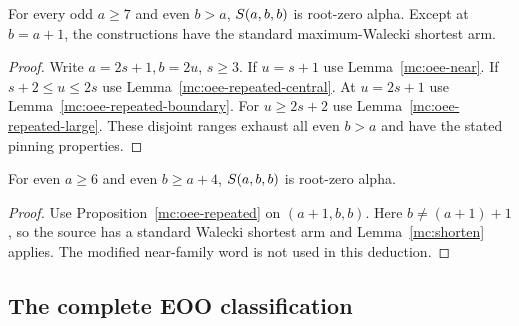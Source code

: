 \begin{proposition}\label{mc:oee-repeated}
For every odd $a\ge7$ and even $b>a$, $S\!\left(a,b,b\right)$ is
root-zero alpha.  Except at $b=a+1$, the constructions have the
standard maximum-Walecki shortest arm.
\end{proposition}
\begin{proof}
Write $a=2s+1,b=2u$, $s\ge3$.  If $u=s+1$ use
Lemma~\ref{mc:oee-near}.  If $s+2\le u\le2s$ use
Lemma~\ref{mc:oee-repeated-central}.  At $u=2s+1$ use
Lemma~\ref{mc:oee-repeated-boundary}.  For $u\ge2s+2$ use
Lemma~\ref{mc:oee-repeated-large}.  These disjoint ranges exhaust
all even $b>a$ and have the stated pinning properties.
\end{proof}

\begin{corollary}\label{mc:eee-repeated}
For even $a\ge6$ and even $b\ge a+4$, $S\!\left(a,b,b\right)$ is
root-zero alpha.
\end{corollary}
\begin{proof}
Use Proposition~\ref{mc:oee-repeated} on $(a+1,b,b)$.
Here $b\ne(a+1)+1$, so the source has a standard Walecki
shortest arm and Lemma~\ref{mc:shorten} applies.  The modified
near-family word is not used in this deduction.
\end{proof}

\subsection{The complete EOO classification}
\label{construction:all-eoo-alpha3}
\label{mc:all-eoo-section}

